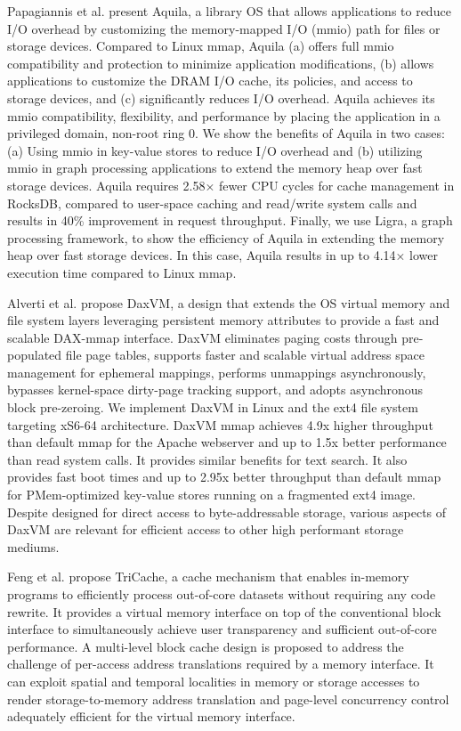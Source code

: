 Papagiannis et al. \cite{papagiannis2021memory} present Aquila, a library OS that allows applications to reduce I/O overhead by customizing the memory-mapped I/O (mmio) path for files or storage devices. Compared to Linux mmap, Aquila (a) offers full mmio compatibility and protection to minimize application modifications, (b) allows applications to customize the DRAM I/O cache, its policies, and access to storage devices, and (c) significantly reduces I/O overhead. Aquila achieves its mmio compatibility, flexibility, and performance by placing the application in a privileged domain, non-root ring 0. We show the benefits of Aquila in two cases: (a) Using mmio in key-value stores to reduce I/O overhead and (b) utilizing mmio in graph processing applications to extend the memory heap over fast storage devices. Aquila requires 2.58× fewer CPU cycles for cache management in RocksDB, compared to user-space caching and read/write system calls and results in 40\% improvement in request throughput. Finally, we use Ligra, a graph processing framework, to show the efficiency of Aquila in extending the memory heap over fast storage devices. In this case, Aquila results in up to 4.14× lower execution time compared to Linux mmap.

Alverti et al. \cite{alverti2022daxvm} propose DaxVM, a design that extends the OS virtual memory and file system layers leveraging persistent memory attributes to provide a fast and scalable DAX-mmap interface. DaxVM eliminates paging costs through pre-populated file page tables, supports faster and scalable virtual address space management for ephemeral mappings, performs unmappings asynchronously, bypasses kernel-space dirty-page tracking support, and adopts asynchronous block pre-zeroing. We implement DaxVM in Linux and the ext4 file system targeting xS6-64 architecture. DaxVM mmap achieves 4.9x higher throughput than default mmap for the Apache webserver and up to 1.5x better performance than read system calls. It provides similar benefits for text search. It also provides fast boot times and up to 2.95x better throughput than default mmap for PMem-optimized key-value stores running on a fragmented ext4 image. Despite designed for direct access to byte-addressable storage, various aspects of DaxVM are relevant for efficient access to other high performant storage mediums.

Feng et al. \cite{feng2023tricache} propose TriCache, a cache mechanism that enables in-memory programs to efficiently process out-of-core datasets without requiring any code rewrite. It provides a virtual memory interface on top of the conventional block interface to simultaneously achieve user transparency and sufficient out-of-core performance. A multi-level block cache design is proposed to address the challenge of per-access address translations required by a memory interface. It can exploit spatial and temporal localities in memory or storage accesses to render storage-to-memory address translation and page-level concurrency control adequately efficient for the virtual memory interface.

